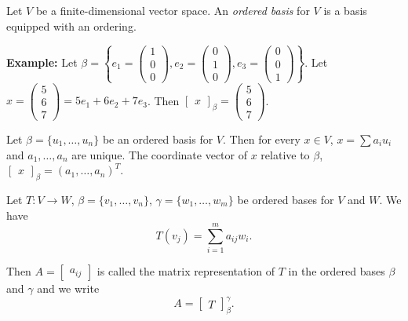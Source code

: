 \documentclass[12pt]{article}
\newenvironment{definition}[2][Definition]{\begin{trivlist}
\item[\hskip \labelsep {\bfseries #1}\hskip \labelsep {\bfseries #2}]}{\end{trivlist}}
\begin{document}
\begin{definition}{3}
Let $V$ be a finite-dimensional vector space. An \textit{ordered basis} for $V$ is a basis equipped with an ordering.
\end{definition}

\noindent\textbf{Example:} Let $\beta = \left\{e_1 = \begin{pmatrix}
1 \\ 0 \\ 0
\end{pmatrix}, e_2 = \begin{pmatrix}
0 \\ 1 \\ 0
\end{pmatrix}, e_3 = \begin{pmatrix}
0 \\ 0 \\ 1
\end{pmatrix} \right\}$. Let $x = \begin{pmatrix}
5 \\ 6 \\ 7
\end{pmatrix} = 5e_1 + 6e_2 + 7e_3$. Then $\begin{bmatrix}
x
\end{bmatrix}_\beta = \begin{pmatrix}
5 \\ 6 \\ 7
\end{pmatrix}$.

\begin{definition}{4}
Let $\beta = \{u_1, \dots, u_n\}$ be an ordered basis for $V$. Then for every $x \in V$, $x = \sum a_iu_i$ and $a_1,\dots, a_n$ are unique. The coordinate vector of $x$ relative to $\beta$, $\begin{bmatrix} x \end{bmatrix}_\beta = (a_1, \dots, a_n)^T$.
\end{definition}

\noindent Let $T : V \to W$, $\beta = \{v_1, \dots, v_n\}$, $\gamma = \{w_1, \dots, w_m\}$ be ordered bases for $V$ and $W$. We have $$T(v_j) = \sum_{i = 1}^m a_{ij}w_i.$$

\noindent Then $A = \begin{bmatrix} a_{ij} \end{bmatrix}$ is called the matrix representation of $T$ in the ordered bases $\beta$ and $\gamma$ and we write $$A = \begin{bmatrix} T \end{bmatrix}_\beta^\gamma.$$
\end{document}
